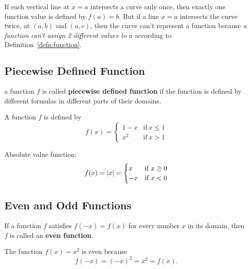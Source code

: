 If each vertical line at $x = a$ intersects a curve only once, then exactly one function
value is defined by $f(a) = b$. But if a line $x = a$ intersects the curve twice, at $(a, b)$
and $(a, c)$, then the curve can't represent a function because \emph{a function can't assign 2 
different values to $a$} according to Definition~\ref{defn:function}.

\subsection{Piecewise Defined Function}\label{subsec:piecewise_func}
\begin{defn}\label{defn:piecewise_func}
    a function $f$ is called \textbf{piecewise defined function} if the function is defined
    by different formulas in different parts of their domains.
\end{defn}

\begin{example} A function $f$ is defined by
    \[
        f(x) = \begin{cases}
            1 - x & \text{if}~x \le 1\\
            x^2 & \text{if}~x > 1
        \end{cases}
    \]
\end{example}

\begin{example} Absolute value function:
    \[
        f(x) = \abs{x} = \begin{cases}
            x & \text{if} ~ x \ge 0\\
            -x & \text{if} ~ x < 0
        \end{cases}
    \]
\end{example}

\subsection{Even and Odd Functions}\label{subsec:even_odd_funcs}
\begin{defn}\label{defn:even_func}
    If a function $f$ satisfies $f(-x) = f(x)$ for every number $x$ in its domain, then $f$ 
    is called an \textbf{even function}.
\end{defn}

\begin{example}
    The function $f(x) = x^2$ is even because
    $$
        f(-x) = (-x)^2 = x^2 = f(x).
    $$
\end{example}

